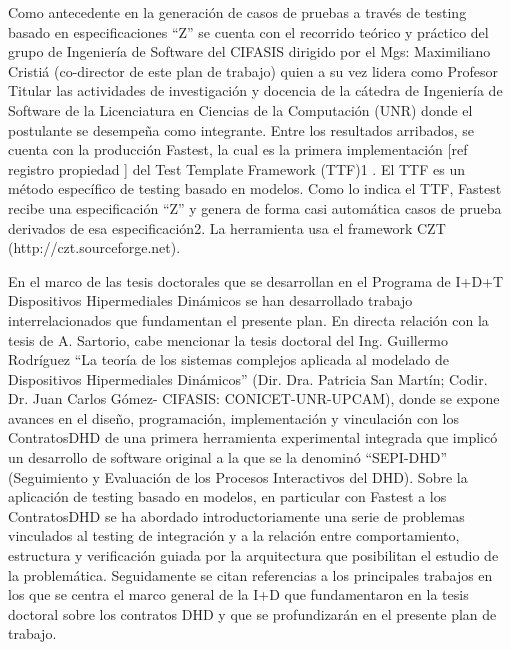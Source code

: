 Como antecedente en la generación de casos de pruebas a través de testing basado
en especificaciones “Z” se cuenta con el recorrido teórico y práctico del grupo
de Ingeniería de Software del CIFASIS dirigido por el Mgs: Maximiliano Cristiá
(co-director de este plan de trabajo)  quien a su vez lidera como Profesor
Titular las actividades de investigación y docencia  de la cátedra de Ingeniería
de Software de la Licenciatura en Ciencias de la Computación (UNR)  donde el
postulante se desempeña como integrante. Entre los resultados arribados, se
cuenta con la producción Fastest, la cual es la primera implementación [ref
registro propiedad ] del Test Template Framework (TTF)1 . El TTF es un método
específico de testing basado en modelos. Como lo indica el TTF, Fastest recibe
una especificación “Z” y genera de forma casi automática casos de prueba
derivados de esa especificación2. La herramienta usa el framework CZT
(http://czt.sourceforge.net). 


En el marco de las tesis doctorales que se desarrollan en el Programa de I+D+T
Dispositivos Hipermediales Dinámicos se han desarrollado trabajo
interrelacionados que fundamentan el presente plan. En directa relación con la
tesis de A. Sartorio, cabe mencionar la tesis doctoral del  Ing. Guillermo
Rodríguez “La teoría de los sistemas complejos aplicada al modelado de
Dispositivos Hipermediales Dinámicos” (Dir. Dra. Patricia San Martín; Codir. Dr.
Juan Carlos Gómez- CIFASIS: CONICET-UNR-UPCAM),  donde se expone avances en el
diseño, programación,  implementación y vinculación con los ContratosDHD de una
primera herramienta experimental integrada que implicó un desarrollo de software
original a la que se la denominó “SEPI-DHD”  (Seguimiento y Evaluación de los
Procesos Interactivos del DHD).
Sobre la aplicación de testing basado en modelos, en particular con Fastest a
los ContratosDHD se ha abordado introductoriamente una serie de problemas
vinculados al testing de integración y a la relación entre comportamiento,
estructura y verificación guiada por la arquitectura que posibilitan el estudio
de la problemática. Seguidamente se citan referencias a los principales trabajos
en los que se centra el marco general de la I+D que fundamentaron en la tesis
doctoral sobre los contratos DHD y que se profundizarán en el presente plan de
trabajo.

